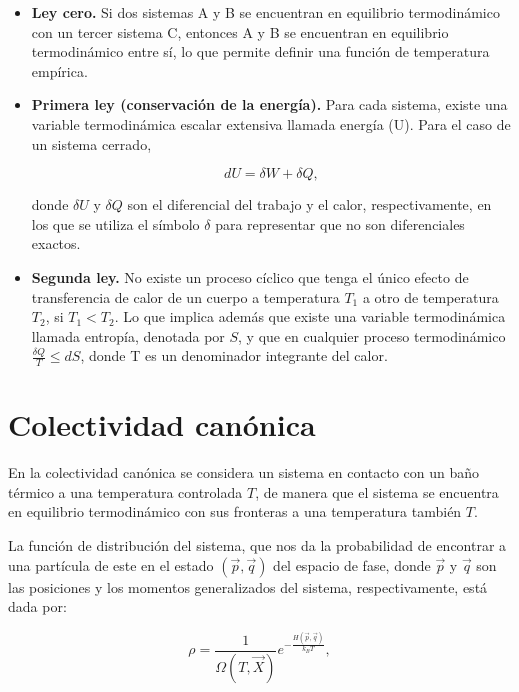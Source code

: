 \documentclass[letterpaper,12pt,oneside]{book}
\begin{document}
	\begin{itemize}
		\item \textbf{Ley cero.} Si dos sistemas A y B se encuentran en equilibrio termodin\'amico con un tercer sistema C, entonces A y B se encuentran en equilibrio termodin\'amico entre s\'i, lo que permite definir una funci\'on de temperatura emp\'irica.
		
		\item \textbf{Primera ley (conservaci\'on de la energ\'ia).} Para cada sistema, existe una variable termodin\'amica escalar extensiva llamada energ\'ia (U). Para el caso de un sistema cerrado, 
		
		\begin{equation}
			dU = \delta W + \delta Q, 
		\end{equation}
		
		\noindent donde $\delta U$ y $\delta Q$ son el diferencial del trabajo y el calor, respectivamente, en los que se utiliza el s\'imbolo $\delta$ para representar que no son diferenciales exactos.
		
		\item \textbf{Segunda ley. } No existe un proceso c\'iclico que tenga el \'unico efecto de transferencia de calor de un cuerpo a temperatura $T_1$ a otro de temperatura $T_2$, si $T_1 < T_2$. Lo que implica adem\'as que existe una variable termodin\'amica llamada entrop\'ia, denotada por $S$, y que en cualquier proceso termodin\'amico $ \frac{\delta Q}{T} \leq dS$, donde T es un denominador integrante del calor. 
	\end{itemize}
	
	\section{Colectividad can\'onica}
	
	En la colectividad can\'onica se considera un sistema en contacto con un baño t\'ermico a una temperatura controlada $T$, de manera que el sistema se encuentra en equilibrio termodin\'amico con sus fronteras a una temperatura tambi\'en $T$. 
	
	La funci\'on de distribuci\'on del sistema, que nos da la probabilidad de encontrar a una part\'icula de este en el estado $(\vec{p},\vec{q})$ del espacio de fase, donde $\vec{p}$ y $\vec{q}$  son las posiciones y los momentos generalizados del sistema, respectivamente, est\'a dada por:
	
	\begin{equation}
		\rho = \frac{1}{\Omega(T, \vec{X})} e^{-\frac{H(\vec{p}, \vec{q})}{k_B T}},
	\end{equation}
	
\end{document}
